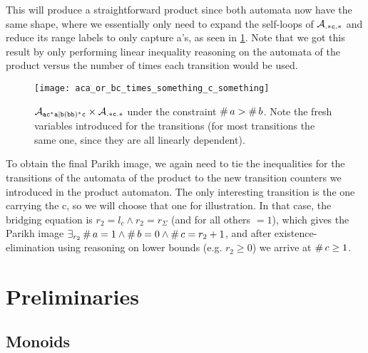 \documentclass[acmsmall,review,anonymous,screen]{acmart}\settopmatter{printfolios=true,printccs=false,printacmref=true}
\theoremstyle{definition}
\begin{document}
This will produce a straightforward product since both automata now have the
same shape, where we essentially only need to expand the self-loops of
$\mathcal{A}_{\mathtt{.*c.*}}$ and reduce its range labels to only capture a's, as seen
in \cref{fig:final-example}. Note that we got this result by only performing
linear inequality reasoning on the automata of the product versus the number of
times each transition would be used.

\begin{figure}[t]
\centering
    \texttt{[image: aca\_or\_bc\_times\_something\_c\_something]}
    \caption{$\mathcal{A}_{\mathtt{ac^*a|b(bb)^*c}}{} \times \mathcal{A}_{\mathtt{.*c.*}}{}$ under the constraint
    $\operatorname{\#}{a} > \operatorname{\#}{b}$. Note the fresh variables
    introduced for the transitions (for most transitions the same one, since
    they are all linearly dependent).}\label{fig:final-example} 
  \end{figure}


To obtain the final Parikh image, we again need to tie the inequalities for the
transitions of the automata of the product to the new transition counters we
introduced in the product automaton. The only interesting transition is the one
carrying the c, so we will choose that one for illustration. In that case, the
bridging equation is $r_2 = l_c \land r_2 = r_{\Sigma}$ (and for all others
$=1$), which gives the Parikh image $\exists_{r_2} \operatorname{\#}{a} = 1 \land
\operatorname{\#}{b} = 0 \land \operatorname{\#}{c} = r_2 + 1$, and after
existence-elimination using reasoning on lower bounds (e.g. $r_2 \geq 0$) we
arrive at $\operatorname{\#}{c} \geq 1$.

\section{Preliminaries}

\subsection{Monoids}
\end{document}
